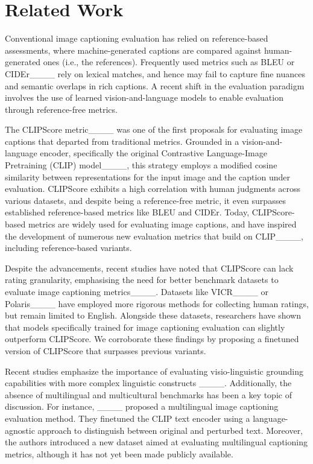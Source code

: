 \section{Related Work}
Conventional image captioning evaluation has relied on reference-based assessments, where machine-generated captions are compared against human-generated ones (i.e., the references). 
Frequently used metrics such as BLEU or CIDEr____  rely on lexical matches, and hence may fail to capture fine nuances and semantic overlaps in rich captions. A recent shift in the evaluation paradigm involves the use of learned vision-and-language models to enable evaluation through reference-free metrics.

The CLIPScore metric____ was one of the first proposals for evaluating image captions that departed from traditional metrics. Grounded in a vision-and-language encoder, specifically the original Contrastive Language-Image Pretraining (CLIP) model____, this strategy employs a modified cosine similarity between representations for the input image and the caption under evaluation. CLIPScore exhibits a high correlation with human judgments across various datasets, and despite being a reference-free metric, it even surpasses established reference-based metrics like BLEU and CIDEr. Today, CLIPScore-based metrics are widely used for evaluating image captions, and have inspired the development of numerous new evaluation metrics that build on CLIP____, including reference-based variants.

Despite the advancements, recent studies have noted that CLIPScore can lack rating granularity, emphasising the need for better benchmark datasets to evaluate image captioning metrics____. Datasets like VICR____ or Polaris____ have employed more rigorous methods for collecting human ratings, but remain limited to English. Alongside these datasets, researchers have shown that models specifically trained for image captioning evaluation can slightly outperform CLIPScore. We corroborate these findings by proposing a finetuned version of CLIPScore that surpasses previous variants.

Recent studies emphasize the importance of evaluating visio-linguistic grounding capabilities with more complex linguistic constructs ____. Additionally, the absence of multilingual and multicultural benchmarks has been a key topic of discussion. For instance, ____ proposed a multilingual image captioning evaluation method. They finetuned the CLIP text encoder using a language-agnostic approach to distinguish between original and perturbed text. Moreover, the authors introduced a new dataset aimed at evaluating multilingual captioning metrics, although it has not yet been made publicly available.

